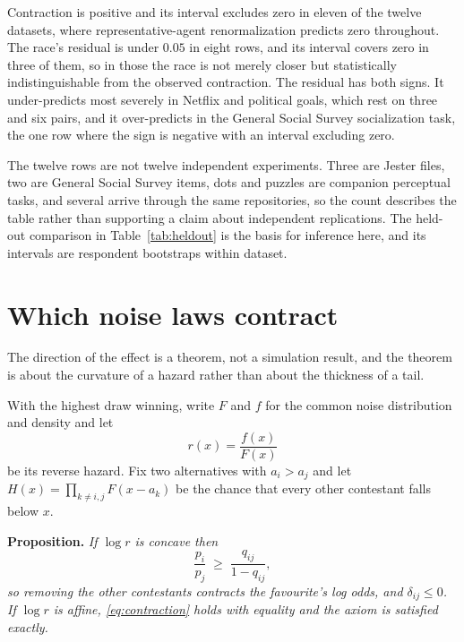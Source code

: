 \documentclass[11pt]{article}
\begin{document}
Contraction is positive and its interval excludes zero in eleven of the twelve
datasets, where representative-agent renormalization predicts zero throughout. The
race's residual is under $0.05$ in eight rows, and its interval covers zero in three
of them, so in those the race is not merely closer but statistically
indistinguishable from the observed contraction. The residual has both signs. It
under-predicts most severely in Netflix and political goals, which rest on three and
six pairs, and it over-predicts in the General Social Survey socialization task, the
one row where the sign is negative with an interval excluding zero.

The twelve rows are not twelve independent experiments. Three are Jester files, two
are General Social Survey items, dots and puzzles are companion perceptual tasks, and
several arrive through the same repositories, so the count describes the table rather
than supporting a claim about independent replications. The held-out comparison in Table~\ref{tab:heldout} is the basis for
inference here, and its intervals are respondent bootstraps within dataset.

\section{Which noise laws contract}
\label{sec:noise}

The direction of the effect is a theorem, not a simulation result, and the theorem
is about the curvature of a hazard rather than about the thickness of a tail.

With the highest draw winning, write $F$ and $f$ for the common noise distribution
and density and let
\begin{equation}
r(x) = \frac{f(x)}{F(x)}
\label{eq:revhaz}
\end{equation}
be its reverse hazard. Fix two alternatives with $a_i > a_j$ and let $H(x) =
\prod_{k \neq i,j} F(x - a_k)$ be the chance that every other contestant falls below
$x$.

\medskip
\noindent\textbf{Proposition.} \emph{If $\log r$ is concave then}
\begin{equation}
\frac{p_i}{p_j} \;\ge\; \frac{q_{ij}}{1 - q_{ij}},
\label{eq:contraction}
\end{equation}
\emph{so removing the other contestants contracts the favourite's log odds, and
$\delta_{ij} \le 0$. If $\log r$ is affine, \eqref{eq:contraction} holds with
equality and the axiom is satisfied exactly.}
\end{document}
